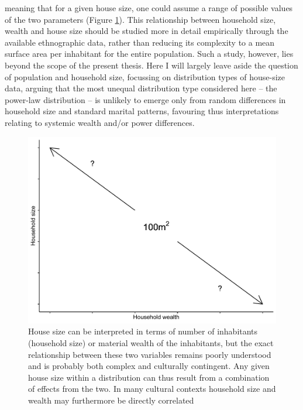 \documentclass[
  12pt,
  a4paper, twoside]{book}
\begin{document}
meaning that for a given house size, one could assume a range of possible values of the two parameters (Figure \ref{fig:04-intro}). This relationship between household size, wealth and house size should be studied more in detail empirically through the available ethnographic data, rather than reducing its complexity to a mean surface area per inhabitant for the entire population. Such a study, however, lies beyond the scope of the present thesis. Here I will largely leave aside the question of population and household size, focussing on distribution types of house-size data, arguing that the most unequal distribution type considered here -- the power-law distribution -- is unlikely to emerge only from random differences in household size and standard marital patterns, favouring thus interpretations relating to systemic wealth and/or power differences.



\begin{figure}

{\centering \includegraphics[width=0.9\linewidth]{bookdown-demo_files/figure-latex/04-intro-1} 

}

\caption[House size, household size and wealth]{House size can be interpreted in terms of number of inhabitants (household size) or material wealth of the inhabitants, but the exact relationship between these two variables remains poorly understood and is probably both complex and culturally contingent. Any given house size within a distribution can thus result from a combination of effects from the two. In many cultural contexts household size and wealth may furthermore be directly correlated}\label{fig:04-intro}
\end{figure}
\end{document}
